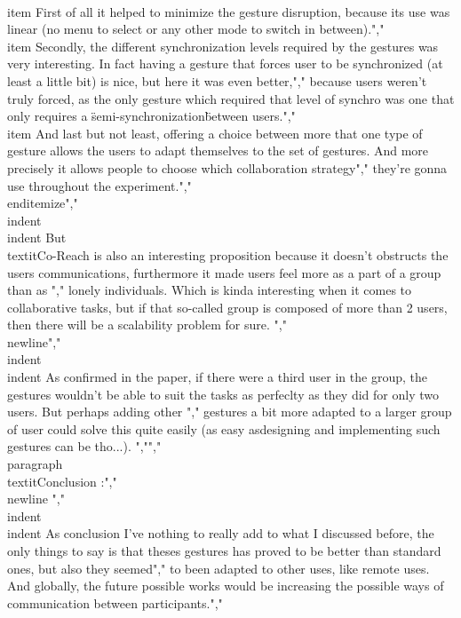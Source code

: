    \\item First of all it helped to minimize the gesture disruption, because its use was linear (no menu to select or any other mode to switch in between).","        \\item Secondly, the different synchronization levels required by the gestures was very interesting. In fact having a gesture that forces user to be synchronized (at least a little bit) is nice, but here it was even better,","            because users weren't truly forced, as the only gesture which required that level of synchro was one that only requires a \"semi-synchronization\" between users.","        \\item And last but not least, offering a choice between more that one type of gesture allows the users to adapt themselves to the set of gestures. And more precisely it allows people to choose which collaboration strategy","            they're gonna use throughout the experiment.","    \\end{itemize}","    \\indent \\indent But \\textit{Co-Reach} is also an interesting proposition because it doesn't obstructs the users communications, furthermore it made users feel more as a part of a group than as ","    lonely individuals. Which is kinda interesting when it comes to collaborative tasks, but if that so-called group is composed of more than 2 users, then there will be a scalability problem for sure. ","    \\newline","    \\indent \\indent As confirmed in the paper, if there were a third user in the group, the gestures wouldn't be able to suit the tasks as perfeclty as they did for only two users. But perhaps adding other ","    gestures a bit more adapted to a larger group of user could solve this quite easily (as easy asdesigning and implementing such gestures can be tho...). ","","    \\paragraph{ \\textit{Conclusion :}","                \\newline }","    \\indent \\indent As conclusion I've nothing to really add to what I discussed before, the only things to say is that theses gestures has proved to be better than standard ones, but also they seemed","    to been adapted to other uses, like remote uses. And globally, the future possible works would be increasing the possible ways of communication between participants.","    